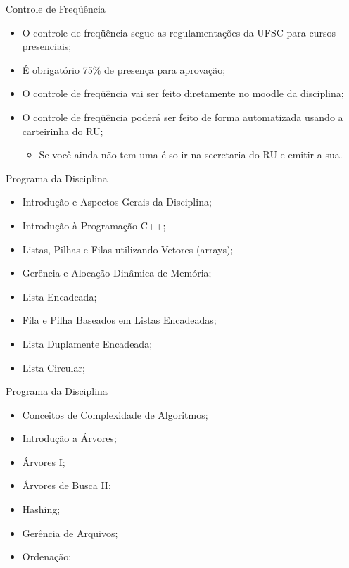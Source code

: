 \documentclass[12pt]{beamer}
\begin{document}
\begin{frame}{Controle de Freqüência}
\begin{itemize}
\item O controle de freqüência segue as regulamentações da UFSC para cursos presenciais;
\item É obrigatório 75\% de presença para aprovação;
\item O controle de freqüência vai ser feito diretamente no moodle da disciplina;
\item O controle de freqüência poderá ser feito de forma automatizada usando a carteirinha do RU;
\begin{itemize}
\item Se você ainda não tem uma é so ir na secretaria do RU e emitir a sua.
\end{itemize}
\end{itemize}
\end{frame}

\begin{frame}{Programa da Disciplina}
\begin{itemize}
\item Introdução e Aspectos Gerais da Disciplina;
\item Introdução à Programação C++;
\item Listas, Pilhas e Filas utilizando Vetores (arrays);
\item Gerência e Alocação Dinâmica de Memória;
\item Lista Encadeada;
\item Fila e Pilha Baseados em Listas Encadeadas;
\item Lista Duplamente Encadeada;
\item Lista Circular;
\end{itemize}
\end{frame}

\begin{frame}{Programa da Disciplina}
\begin{itemize}
\item Conceitos de Complexidade de Algoritmos;
\item Introdução a Árvores;
\item Árvores I;
\item Árvores de Busca II;
\item Hashing;
\item Gerência de Arquivos;
\item Ordenação;
\end{itemize}
\end{frame}
\end{document}
